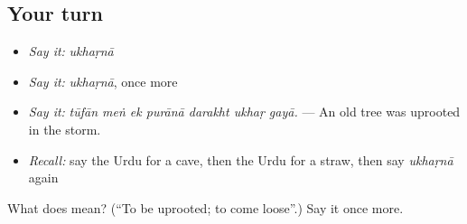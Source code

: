 \subsection*{Your turn}
\begin{itemize}
\raggedright
  \item \emph{Say it:} \emph{ukhaṛnā}
  \item \emph{Say it:} \emph{ukhaṛnā}, once more
  \item \emph{Say it:} \emph{tūfān meṅ ek purānā darakht ukhaṛ gayā.} — An old tree was uprooted in the storm.
  \item \emph{Recall:} say the Urdu for a cave, then the Urdu for a straw, then say \emph{ukhaṛnā} again
\end{itemize}

\begin{tcolorbox}[breakable,colback=teal!4,colframe=teal!35!black,title={Before you move on}]
What does  mean? (\textquotedblleft{}To be uprooted; to come loose\textquotedblright{}.) Say it once more.
\end{tcolorbox}
